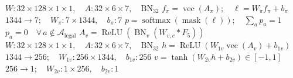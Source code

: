 \documentclass[multi=mathasset,border=0pt]{standalone}
\newenvironment{mathasset}{}{}
\begin{document}
\begin{mathasset}\fontsize{23bp}{27bp}\selectfont\color[HTML]{596779}\(W:32{\times}128{\times}1{\times}1,\quad A:32{\times}6{\times}7,\quad\mathrm{BN}_{32}\)\end{mathasset}
\begin{mathasset}\fontsize{28bp}{33bp}\selectfont\color[HTML]{253044}\(f_\pi=\operatorname{vec}(A_\pi);\quad \ell=W_\pi f_\pi+b_\pi\)\end{mathasset}
\begin{mathasset}\fontsize{23bp}{27bp}\selectfont\color[HTML]{596779}\(1344\to7;\quad W_\pi:7\times1344,\quad b_\pi:7\)\end{mathasset}
\begin{mathasset}\fontsize{28bp}{33bp}\selectfont\color[HTML]{253044}\(p=\operatorname{softmax}(\operatorname{mask}(\ell));\quad \sum_a p_a=1\)\end{mathasset}
\begin{mathasset}\fontsize{23bp}{27bp}\selectfont\color[HTML]{596779}\(p_a=0\quad\forall\,a\notin\mathcal A_{\mathrm{legal}}\)\end{mathasset}
\begin{mathasset}\fontsize{28bp}{33bp}\selectfont\color[HTML]{253044}\(A_v=\operatorname{ReLU}(\operatorname{BN}_v(W_{v,c}\ast F_5))\)\end{mathasset}
\begin{mathasset}\fontsize{23bp}{27bp}\selectfont\color[HTML]{596779}\(W:32{\times}128{\times}1{\times}1,\quad A:32{\times}6{\times}7,\quad\mathrm{BN}_{32}\)\end{mathasset}
\begin{mathasset}\fontsize{28bp}{33bp}\selectfont\color[HTML]{253044}\(h=\operatorname{ReLU}(W_{1v}\operatorname{vec}(A_v)+b_{1v})\)\end{mathasset}
\begin{mathasset}\fontsize{23bp}{27bp}\selectfont\color[HTML]{596779}\(1344\to256;\quad W_{1v}:256\times1344,\quad b_{1v}:256\)\end{mathasset}
\begin{mathasset}\fontsize{28bp}{33bp}\selectfont\color[HTML]{253044}\(v=\tanh(W_{2v}h+b_{2v})\in[-1,1]\)\end{mathasset}
\begin{mathasset}\fontsize{23bp}{27bp}\selectfont\color[HTML]{596779}\(256\to1;\quad W_{2v}:1\times256,\quad b_{2v}:1\)\end{mathasset}
\end{document}
